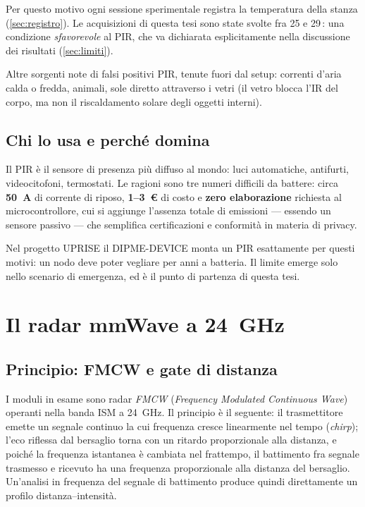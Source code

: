 Per questo motivo ogni sessione sperimentale registra la temperatura della stanza
(\cref{sec:registro}). Le acquisizioni di questa tesi sono state svolte fra 25 e
29\,\celsius: una condizione \emph{sfavorevole} al PIR, che va dichiarata
esplicitamente nella discussione dei risultati (\cref{sec:limiti}).

Altre sorgenti note di falsi positivi PIR, tenute fuori dal setup: correnti d'aria
calda o fredda, animali, sole diretto attraverso i vetri (il vetro blocca l'IR del
corpo, ma non il riscaldamento solare degli oggetti interni).

\subsection{Chi lo usa e perché domina}
\label{sec:pir-usi}

Il PIR è il sensore di presenza più diffuso al mondo: luci automatiche, antifurti,
videocitofoni, termostati. Le ragioni sono tre numeri difficili da battere:
circa \textbf{50~\textmu A} di corrente di riposo, \textbf{1--3~\euro} di costo e
\textbf{zero elaborazione} richiesta al microcontrollore, cui si aggiunge l'assenza
totale di emissioni --- essendo un sensore passivo --- che semplifica
certificazioni e conformità in materia di privacy.

Nel progetto UPRISE il DIPME-DEVICE monta un PIR esattamente per questi motivi: un
nodo deve poter vegliare per anni a batteria. Il limite emerge solo nello scenario
di emergenza, ed è il punto di partenza di questa tesi.

\section{Il radar mmWave a 24~GHz}
\label{sec:mmwave}

\subsection{Principio: FMCW e gate di distanza}

I moduli in esame sono radar \emph{FMCW} (\emph{Frequency Modulated Continuous
Wave}) operanti nella banda ISM a 24~GHz. Il principio è il seguente: il
trasmettitore emette un segnale continuo la cui frequenza cresce linearmente nel
tempo (\emph{chirp}); l'eco riflessa dal bersaglio torna con un ritardo
proporzionale alla distanza, e poiché la frequenza istantanea è cambiata nel
frattempo, il battimento fra segnale trasmesso e ricevuto ha una frequenza
proporzionale alla distanza del bersaglio. Un'analisi in frequenza del segnale di
battimento produce quindi direttamente un profilo distanza--intensità.

